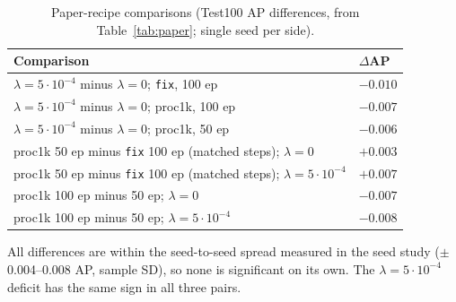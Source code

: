 \documentclass[10pt]{article}
\begin{document}
\begin{table}[h]\centering\small
\begin{threeparttable}
\caption{Paper-recipe comparisons (Test100 AP differences, from Table~\ref{tab:paper}; single seed per side).}
\begin{tabularx}{\linewidth}{X l}
\toprule
Comparison & $\Delta$AP \\
\midrule
$\lambda=5\cdot10^{-4}$ minus $\lambda=0$; \texttt{fix}, 100 ep & $-0.010$ \\
$\lambda=5\cdot10^{-4}$ minus $\lambda=0$; proc1k, 100 ep & $-0.007$ \\
$\lambda=5\cdot10^{-4}$ minus $\lambda=0$; proc1k, 50 ep & $-0.006$ \\
\addlinespace
proc1k 50 ep minus \texttt{fix} 100 ep (matched steps); $\lambda=0$ & $+0.003$ \\
proc1k 50 ep minus \texttt{fix} 100 ep (matched steps); $\lambda=5\cdot10^{-4}$ & $+0.007$ \\
\addlinespace
proc1k 100 ep minus 50 ep; $\lambda=0$ & $-0.007$ \\
proc1k 100 ep minus 50 ep; $\lambda=5\cdot10^{-4}$ & $-0.008$ \\
\bottomrule
\end{tabularx}
\begin{tablenotes}\footnotesize
\item All differences are within the seed-to-seed spread measured in the seed study ($\pm$0.004--0.008 AP, sample SD), so none is significant on its own. The $\lambda=5\cdot10^{-4}$ deficit has the same sign in all three pairs.
\end{tablenotes}
\end{threeparttable}
\end{table}
\end{document}
